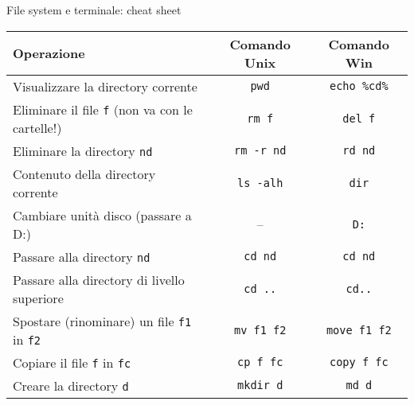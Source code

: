 \documentclass[presentation]{beamer}
\begin{document}
\begin{frame}[fragile]{File system e terminale: cheat sheet}
\label{slide:commands}
  \begin{center}
    \begin{tabular}{| l | c | c |}
      \hline
      \textbf{Operazione} & \textbf{Comando Unix} & \textbf{Comando Win} \\ \hline
      \scriptsize{}Visualizzare la directory corrente & \texttt{pwd} & \texttt{echo \%cd\%}  \\ \hline
      \scriptsize{}Eliminare il file \texttt{f} (non va con le cartelle!) & \texttt{rm f} & \texttt{del f} \\ \hline
      \scriptsize{}Eliminare la directory \texttt{nd} & \texttt{rm -r nd} & \texttt{rd nd} \\ \hline
      \scriptsize{}Contenuto della directory corrente & \texttt{ls -alh} & \texttt{dir} \\ \hline
      \scriptsize{}Cambiare unità disco (passare a D:) & -- & \texttt{D:} \\ \hline
      \scriptsize{}Passare alla directory \texttt{nd} & \texttt{cd nd} & \texttt{cd nd} \\ \hline
      \scriptsize{}Passare alla directory di livello superiore & \texttt{cd ..} & \texttt{cd..} \\ \hline
      \scriptsize{}Spostare (rinominare) un file \texttt{f1} in \texttt{f2} & \texttt{mv f1 f2} & \texttt{move f1 f2} \\ \hline
      \scriptsize{}Copiare il file \texttt{f} in \texttt{fc} & \texttt{cp f fc} & \texttt{copy f fc} \\ \hline
      \scriptsize{}Creare la directory \texttt{d} & \texttt{mkdir d} & \texttt{md d} \\ \hline
    \end{tabular}
  \end{center}
\end{frame}
\end{document}
